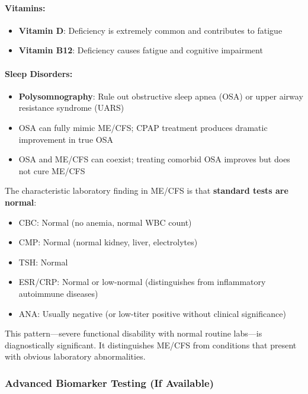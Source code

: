 \begin{requirement}
\paragraph{Vitamins:}
\begin{itemize}
    \item \textbf{Vitamin D}: Deficiency is extremely common and contributes to fatigue
    \item \textbf{Vitamin B12}: Deficiency causes fatigue and cognitive impairment
\end{itemize}

\paragraph{Sleep Disorders:}
\begin{itemize}
    \item \textbf{Polysomnography}: Rule out obstructive sleep apnea (OSA) or upper airway resistance syndrome (UARS)
    \item OSA can fully mimic ME/CFS; CPAP treatment produces dramatic improvement in true OSA
    \item OSA and ME/CFS can coexist; treating comorbid OSA improves but does not cure ME/CFS
\end{itemize}
\end{requirement}

\begin{observation}
\label{obs:lab-profile}
The characteristic laboratory finding in ME/CFS is that \textbf{standard tests are normal}:
\begin{itemize}
    \item CBC: Normal (no anemia, normal WBC count)
    \item CMP: Normal (normal kidney, liver, electrolytes)
    \item TSH: Normal
    \item ESR/CRP: Normal or low-normal (distinguishes from inflammatory autoimmune diseases)
    \item ANA: Usually negative (or low-titer positive without clinical significance)
\end{itemize}

This pattern---severe functional disability with normal routine labs---is diagnostically significant. It distinguishes ME/CFS from conditions that present with obvious laboratory abnormalities.
\end{observation}

\subsubsection{Advanced Biomarker Testing (If Available)}

